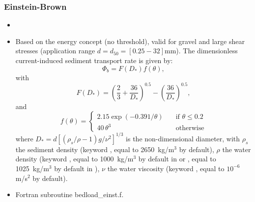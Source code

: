 \subsubsection{Einstein-Brown}
\begin{itemize}
\item {}
\item Based on the energy concept (no threshold), valid for gravel and large shear
stresses (application range $d=d_{50} = [0.25-32]$mm). The dimensionless current-induced sediment transport rate is given by:
\begin{equation*}
\Phi_b = F(D_*)f(\theta),
\end{equation*}
with
\begin{equation*}\label{eq:EinsteinFDs}
F(D_*) = \left(\frac{2}{3} +\frac{36}{D_*}\right)^{0.5} - \left( \frac{36}{D_*}\right)^{0.5},
\end{equation*}
and
\begin{equation*}
f(\theta)=\left\{\begin{array}{ll}
2.15\exp(-0.391/\theta) & \quad\text{if}\,\,\theta \leq 0.2 \\
40\,\theta^{3}          & \quad\text{otherwise}
\end{array}
\right.
\end{equation*}
where $D_*=d[(\rho_s/\rho-1)g/\nu^2]^{1/3}$ is the non-dimensional diameter,
with $\rho_s$ the sediment density (keyword , equal to
2650~kg/m$^3$ by default),
$\rho$ the water density (keyword , equal to 1000~kg/m$^3$ by default in
 or , equal to 1025~kg/m$^3$ by default in
),
$\nu$ the water viscosity (keyword , equal to $10^{-6}$ m/s$^2$ by default).
\item Fortran subroutine {\ttfamily bedload\_einst.f}.
\end{itemize}

